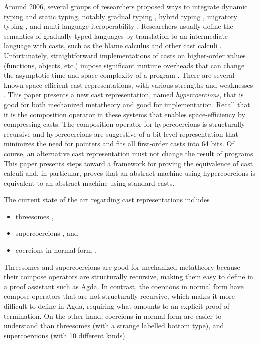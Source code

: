 \documentclass[acmsmall,review,anonymous]{acmart}\settopmatter{printfolios=true,printccs=false,printacmref=false}
\begin{document}
Around 2006, several groups of researchers proposed ways to integrate
dynamic typing and static typing, notably gradual typing
\citep{siek2006gradual}, hybrid typing \citep{flanagan2006hybrid},
migratory typing \citep{Tobin-Hochstadt:2006fk}, and multi-language
iteroperability \citep{Gray:2005ij,Matthews:2007zr}. Researchers
usually define the semantics of gradually typed languages by
translation to an intermediate language with casts, such as the blame
calculus \citep{wadler2009well} and other cast calculi
\citep{siek2009exploring}. Unfortunately, straightforward
implementations of casts on higher-order values (functions, objects,
etc.) impose significant runtime overheads that can change the
asymptotic time and space complexity of a program
\citep{herman2010space}. There are several known space-efficient cast
representations, with various strengths and weaknesses
\citep{siek2015blame,siek2010threesomes,garcia2013calculating,kuhlenschmidt2018efficient,siek2012interpretations,garcia2014deriving}. This
paper presents a new cast representation, named \emph{hypercoercions},
that is good for both mechanized metatheory and good for
implementation. Recall that it is the composition operator in these
systems that enables space-efficiency by compressing casts.  The
composition operator for hypercoercions is structurally recursive and
hypercoercions are suggestive of a bit-level representation that
minimizes the need for pointers and fits all first-order casts into 64
bits.  Of course, an alternative cast representation must not change
the result of programs. This paper presents steps toward a framework
for proving the equivalence of cast calculi and, in particular, proves
that an abstract machine using hypercoercions is equivalent to an
abstract machine using standard casts.

%

The current state of the art regarding cast representations includes
\begin{itemize}
\item threesomes \citep{siek2010threesomes},
\item supercoercions \citep{garcia2014deriving}, and
\item coercions in normal form
  \citep{siek2012interpretations,siek2015blame}.
\end{itemize}
Threesomes and supercoercions are good for mechanized metatheory
because their compose operators are structurally recursive, making
them easy to define in a proof assistant such as Agda. In contrast,
the coercions in normal form have compose operators that are not
structurally recursive, which makes it more difficult to define in
Agda, requiring what amounts to an explicit proof of termination.
%
On the other hand, coercions in normal form are easier to understand
than threesomes (with a strange labelled bottom type), and
supercoercions (with 10 different kinds). 
\end{document}
